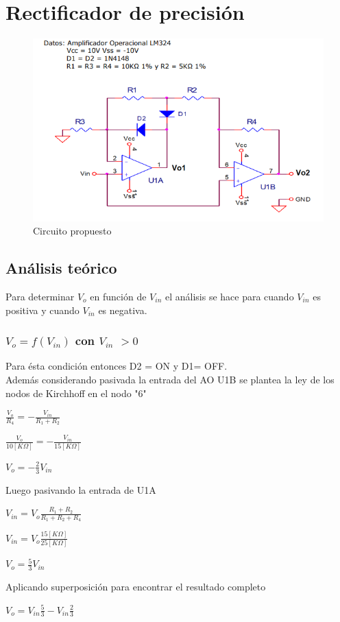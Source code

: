 \newpage
\section{Rectificador de precisión}
\onehalfspacing
\begin{figure}[htb]
	\centering
	\includegraphics[width=1\textwidth]{figuras/Circuito3_consigna.png}
	\caption{Circuito propuesto}
\end{figure}
\subsection{Análisis teórico}
Para determinar $V_o$ en función de $V_{in}$ el análisis se hace para cuando $V_{in}$ es positiva y cuando $V_{in}$ es negativa.
\subsubsection{$V_o = f(V_{in})$ con $V_{in}$ $> 0$  }
Para ésta condición entonces D2 = ON y D1= OFF. \\
Además considerando pasivada la entrada del AO U1B se plantea la ley de los nodos de Kirchhoff en el nodo "6"
\begin{center}
	$\frac{V_o}{R_4} = - \frac{V_{in}}{R_1 + R_2}$
\end{center}
\begin{center}
	$\frac{V_o}{10[K\Omega]} = - \frac{V_{in}}{15[K\Omega]}$
\end{center}
\begin{center}
	$V_o= - \frac{2}{3} V_{in}$
\end{center}
Luego pasivando la entrada de U1A
\begin{center}
	$V_{in}= V_o \frac{R_1 + R_2}{R_1 + R_2 + R_4}$
\end{center}
\begin{center}
	$V_{in}= V_o \frac{15[K\Omega]}{25[K\Omega]}$
\end{center}
\begin{center}
	$V_o = \frac{5}{3} V_{in}$
\end{center}
Aplicando superposición para encontrar el resultado completo
\begin{center}
	$V_o = V_{in} \frac{5}{3} - V_{in} \frac{2}{3}$
\end{center}
\begin{center}
\end{center}


